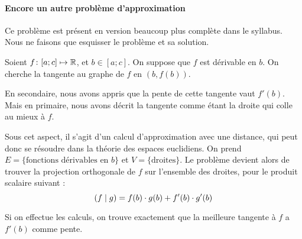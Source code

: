 \paragraph{Encore un autre problème d'approximation}
Ce problème est présent en version beaucoup plus complète dans le syllabus. Nous ne faisons que esquisser le problème et sa solution.

Soient $f \colon [a;c] \mapsto \mathbb{R}$, et $b \in [a;c]$. On suppose que $f$ est dérivable en $b$. On cherche la tangente au graphe de $f$ en $(b, f(b))$.

En secondaire, nous avons appris que la pente de cette tangente vaut $f'(b)$. Mais en primaire, nous avons décrit la tangente comme étant la \og droite qui colle au mieux \fg à $f$.

Sous cet aspect, il s'agit d'un calcul d'approximation avec une distance, qui peut donc se résoudre dans la théorie des espaces euclidiens. On prend $E=\{ \text{fonctions dérivables en } b \}$ et $V=\{ \text{droites} \}$. Le problème devient alors de trouver la projection orthogonale de $f$ sur l'ensemble des droites, pour le produit scalaire suivant :
\[ \left( f \mid g \right) = f(b) \cdot g(b) + f'(b) \cdot g'(b) \]

Si on effectue les calculs, on trouve exactement que la meilleure tangente à $f$ a $f'(b)$ comme pente.







%
